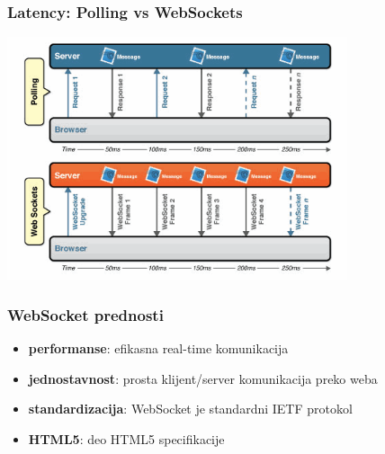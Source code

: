 \documentclass[compress]{beamer}
\begin{document}
\begin{frame}
\frametitle{Latency: Polling vs WebSockets}
\begin{center}
  \includegraphics[width=10cm]{latency-comparison.png}
\end{center}
\end{frame}

\begin{frame}
\frametitle{WebSocket prednosti}
\begin{itemize}
  \item \textbf{performanse}: efikasna real-time komunikacija
  \item \textbf{jednostavnost}: prosta klijent/server komunikacija preko weba
  \item \textbf{standardizacija}: WebSocket je standardni IETF protokol
  \item \textbf{HTML5}: deo HTML5 specifikacije
\end{itemize}

\end{frame}
\end{document}
